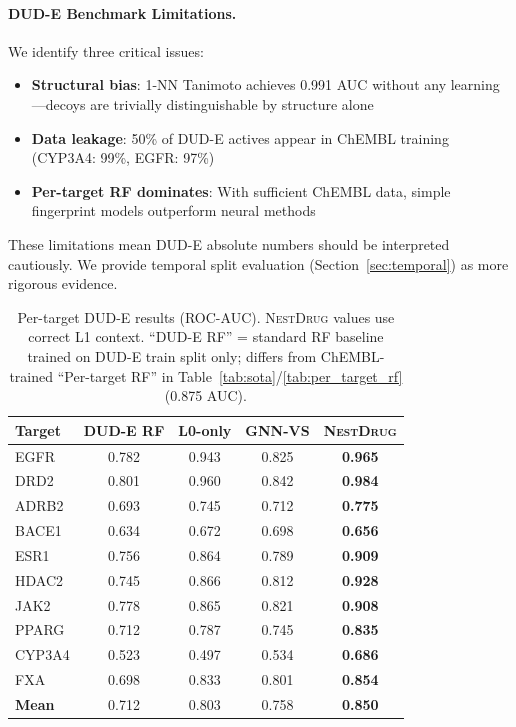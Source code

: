 \documentclass{article}
\newcommand{\methodname}{\textsc{NestDrug}}
\begin{document}
\paragraph{DUD-E Benchmark Limitations.} We identify three critical issues:
\begin{itemize}[noitemsep,topsep=0pt]
\item \textbf{Structural bias}: 1-NN Tanimoto achieves 0.991 AUC without any learning---decoys are trivially distinguishable by structure alone \citep{wallach_2018_dude_bias}
\item \textbf{Data leakage}: 50\% of DUD-E actives appear in ChEMBL training (CYP3A4: 99\%, EGFR: 97\%)
\item \textbf{Per-target RF dominates}: With sufficient ChEMBL data, simple fingerprint models outperform neural methods
\end{itemize}
These limitations mean DUD-E absolute numbers should be interpreted cautiously. We provide temporal split evaluation (Section~\ref{sec:temporal}) as more rigorous evidence.

\begin{table}[t]
\vspace{-2mm}
\caption{Per-target DUD-E results (ROC-AUC). \methodname{} values use correct L1 context. ``DUD-E RF'' = standard RF baseline trained on DUD-E train split only; differs from ChEMBL-trained ``Per-target RF'' in Table~\ref{tab:sota}/\ref{tab:per_target_rf} (0.875 AUC).}
\label{tab:dude_results}
\centering
\small
\begin{tabular*}{\textwidth}{@{\extracolsep{\fill}}lcccc@{}}
\toprule
Target & DUD-E RF & L0-only & GNN-VS & \textbf{\methodname{}} \\
\midrule
EGFR & 0.782 & 0.943 & 0.825 & \textbf{0.965} \\
DRD2 & 0.801 & 0.960 & 0.842 & \textbf{0.984} \\
ADRB2 & 0.693 & 0.745 & 0.712 & \textbf{0.775} \\
BACE1 & 0.634 & 0.672 & 0.698 & \textbf{0.656} \\
ESR1 & 0.756 & 0.864 & 0.789 & \textbf{0.909} \\
HDAC2 & 0.745 & 0.866 & 0.812 & \textbf{0.928} \\
JAK2 & 0.778 & 0.865 & 0.821 & \textbf{0.908} \\
PPARG & 0.712 & 0.787 & 0.745 & \textbf{0.835} \\
CYP3A4 & 0.523 & 0.497 & 0.534 & \textbf{0.686} \\
FXA & 0.698 & 0.833 & 0.801 & \textbf{0.854} \\
\midrule
\textbf{Mean} & 0.712 & 0.803 & 0.758 & \textbf{0.850} \\
\bottomrule
\end{tabular*}
\vspace{-2mm}
\end{table}
\end{document}
